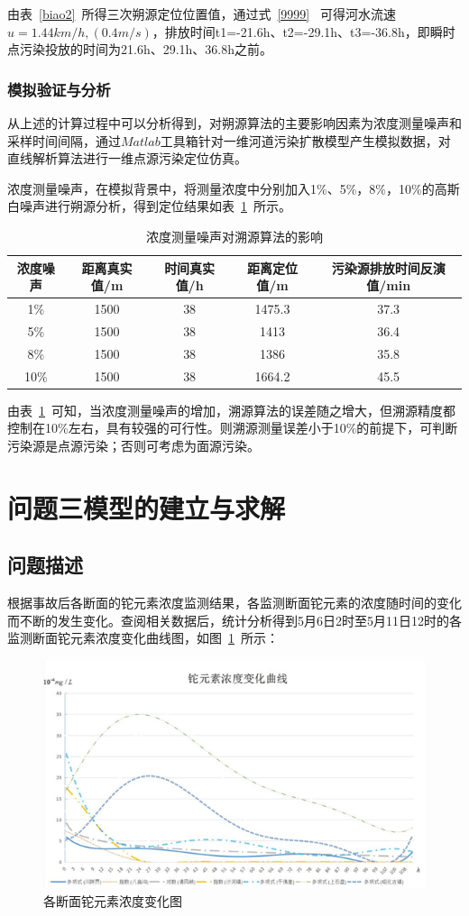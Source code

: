 \documentclass{whutmod}
\begin{document}
由表~\ref{biao2}~所得三次朔源定位位置值，通过式~\ref{9999}~
可得河水流速$u=1.44km/h, (0.4m/s)$，排放时间t1=-21.6h、t2=-29.1h、t3=-36.8h，即瞬时点污染投放的时间为21.6h、29.1h、36.8h之前。

\subsubsection{模拟验证与分析}
 从上述的计算过程中可以分析得到，对朔源算法的主要影响因素为浓度测量噪声和采样时间间隔，通过$Matlab$工具箱针对一维河道污染扩散模型产生模拟数据，对直线解析算法进行一维点源污染定位仿真。

 浓度测量噪声，在模拟背景中，将测量浓度中分别加入1\%、5\%，8\%，10\%的高斯白噪声进行朔源分析，得到定位结果如表~\ref{gsbz}~所示。
		\begin{table}[H]
		\caption{浓度测量噪声对溯源算法的影响}\label{gsbz} \centering
		\begin{tabular}{ccccc}
			\toprule[1.5pt]
			浓度噪声&距离真实值/m&时间真实值/h&距离定位值/m&污染源排放时间反演值/min \\
			\midrule[1pt]
			1\% &1500&38&1475.3&37.3\\
			5\%&1500 &38&1413&36.4\\
			8\% &1500&38&1386&35.8\\
			10\% &1500&38&1664.2&45.5\\
			\bottomrule[1.5pt]
		\end{tabular}
	\end{table}
	由表~\ref{gsbz}~可知，当浓度测量噪声的增加，溯源算法的误差随之增大，但溯源精度都控制在10\%左右，具有较强的可行性。则溯源测量误差小于10\%的前提下，可判断污染源是点源污染；否则可考虑为面源污染。


	\section{问题三模型的建立与求解}
	
	
	\subsection{问题描述}

根据事故后各断面的铊元素浓度监测结果，各监测断面铊元素的浓度随时间的变化而不断的发生变化。查阅相关数据后，统计分析得到5月6日2时至5月11日12时的各监测断面铊元素浓度变化曲线图，如图~\ref{tu}~所示：
				\begin{figure}[H]
		\centering
		\includegraphics[width=.8\textwidth]{figures/tu.png}
		\caption{各断面铊元素浓度变化图}\label{tu}
	\end{figure}
\end{document}

